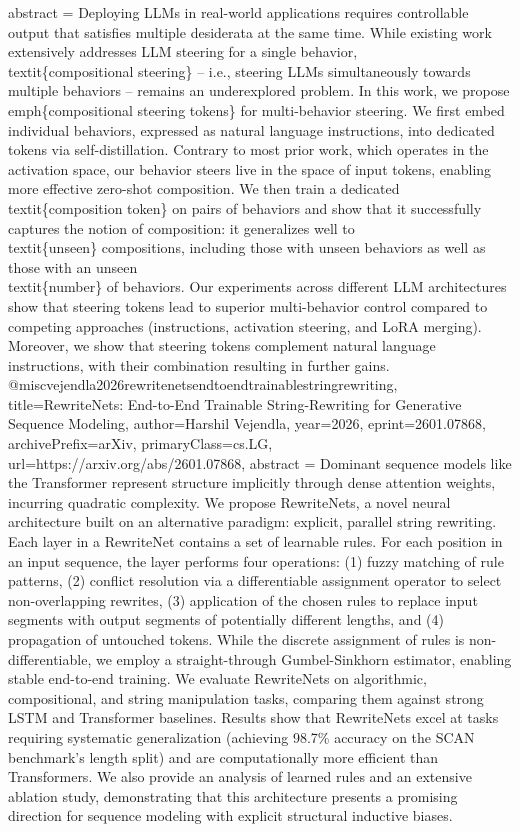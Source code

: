 {      abstract = {Deploying LLMs in real-world applications requires controllable output that satisfies multiple desiderata at the same time. While existing work extensively addresses LLM steering for a single behavior, \\textit\{compositional steering\} -- i.e., steering LLMs simultaneously towards multiple behaviors -- remains an underexplored problem. In this work, we propose \\emph\{compositional steering tokens\} for multi-behavior steering. We first embed individual behaviors, expressed as natural language instructions, into dedicated tokens via self-distillation. Contrary to most prior work, which operates in the activation space, our behavior steers live in the space of input tokens, enabling more effective zero-shot composition. We then train a dedicated \\textit\{composition token\} on pairs of behaviors and show that it successfully captures the notion of composition: it generalizes well to \\textit\{unseen\} compositions, including those with unseen behaviors as well as those with an unseen \\textit\{number\} of behaviors. Our experiments across different LLM architectures show that steering tokens lead to superior multi-behavior control compared to competing approaches (instructions, activation steering, and LoRA merging). Moreover, we show that steering tokens complement natural language instructions, with their combination resulting in further gains.}
}@misc{vejendla2026rewritenetsendtoendtrainablestringrewriting,
      title={RewriteNets: End-to-End Trainable String-Rewriting for Generative Sequence Modeling}, 
      author={Harshil Vejendla},
      year={2026},
      eprint={2601.07868},
      archivePrefix={arXiv},
      primaryClass={cs.LG},
      url={https://arxiv.org/abs/2601.07868},
      abstract = {Dominant sequence models like the Transformer represent structure implicitly through dense attention weights, incurring quadratic complexity. We propose RewriteNets, a novel neural architecture built on an alternative paradigm: explicit, parallel string rewriting. Each layer in a RewriteNet contains a set of learnable rules. For each position in an input sequence, the layer performs four operations: (1) fuzzy matching of rule patterns, (2) conflict resolution via a differentiable assignment operator to select non-overlapping rewrites, (3) application of the chosen rules to replace input segments with output segments of potentially different lengths, and (4) propagation of untouched tokens. While the discrete assignment of rules is non-differentiable, we employ a straight-through Gumbel-Sinkhorn estimator, enabling stable end-to-end training. We evaluate RewriteNets on algorithmic, compositional, and string manipulation tasks, comparing them against strong LSTM and Transformer baselines. Results show that RewriteNets excel at tasks requiring systematic generalization (achieving 98.7\% accuracy on the SCAN benchmark's length split) and are computationally more efficient than Transformers. We also provide an analysis of learned rules and an extensive ablation study, demonstrating that this architecture presents a promising direction for sequence modeling with explicit structural inductive biases.}
}
